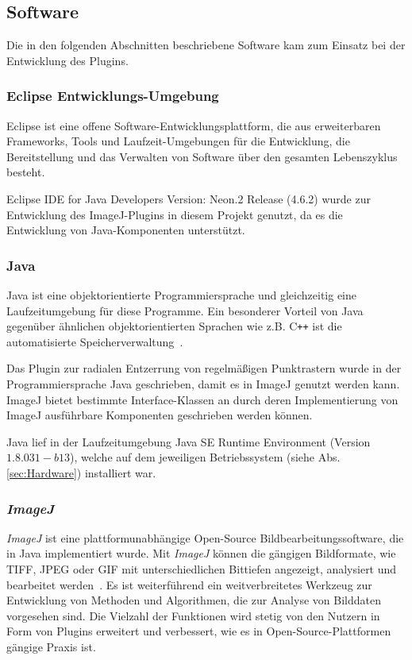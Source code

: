 \subsection{Software}\label{sec:Software}
Die in den folgenden Abschnitten beschriebene Software kam zum Einsatz bei der Entwicklung des Plugins.

\subsubsection{Eclipse Entwicklungs-Umgebung}
Eclipse ist eine offene Software-Entwicklungsplattform, die aus erweiterbaren Frameworks, Tools und Laufzeit-Umgebungen für die Entwicklung, die Bereitstellung und das Verwalten von Software über den gesamten Lebenszyklus besteht.
\cite{eclipse}

Eclipse IDE for Java Developers Version: Neon.2 Release (4.6.2) wurde zur Entwicklung des ImageJ-Plugins in diesem Projekt genutzt, da es die Entwicklung von Java-Komponenten unterstützt. 


\subsubsection{Java}
Java ist eine objektorientierte Programmiersprache und gleichzeitig eine Laufzeitumgebung für diese Programme. Ein besonderer Vorteil von Java gegenüber ähnlichen objektorientierten Sprachen wie z.B. C\texttt{++} ist die automatisierte Speicherverwaltung~\cite{java}. 

Das Plugin zur radialen Entzerrung von regelmäßigen Punktrastern wurde in der Programmiersprache Java geschrieben, damit es in ImageJ genutzt werden kann. ImageJ bietet bestimmte Interface-Klassen an durch deren Implementierung von ImageJ ausführbare Komponenten geschrieben werden können.

Java lief in der Laufzeitumgebung Java SE Runtime Environment (Version $ 1.8.0 31-b13 $), welche auf dem jeweiligen Betriebssystem (siehe Abs. \ref{sec:Hardware}) installiert war.

\subsubsection{\textit{ImageJ}}

\textit{ImageJ} ist eine plattformunabhängige Open-Source Bildbearbeitungssoftware, die in Java implementiert wurde. Mit \textit{ImageJ} können die gängigen Bildformate, wie TIFF, JPEG oder GIF mit unterschiedlichen Bittiefen angezeigt, analysiert und bearbeitet werden~\cite{Collins_ImageJ}. Es ist weiterführend ein weitverbreitetes Werkzeug zur Entwicklung von Methoden und Algorithmen, die zur Analyse von Bilddaten vorgesehen sind. Die Vielzahl der Funktionen wird stetig von den Nutzern in Form von Plugins erweitert und verbessert, wie es in Open-Source-Plattformen gängige Praxis ist.

